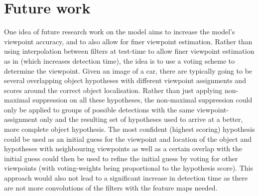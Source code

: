 %

\section{Future work}\label{sec:future}
One idea of future research work on the model  aims to increase the model's viewpoint accuracy, and to also allow for finer viewpoint estimation. Rather than using interpolation between filters at test-time to allow finer viewpoint estimation  as in \cite{Pepik:2012aa} (which increases detection time), the idea is to use a voting scheme to determine the viewpoint. Given an image of a car, there are typically going to be several overlapping object hypotheses with different viewpoint assignments and scores around the correct object localisation. Rather than just applying non-maximal suppression on all these hypotheses, the non-maximal suppression could only be applied to groups of possible detections with the same viewpoint-assignment only and the resulting set of hypotheses used to arrive at a better, more complete object hypothesis. The most confident (highest scoring) hypothesis  could  be used as an initial guess for the viewpoint and location of the object and hypotheses with neighbouring viewpoints as well as a certain overlap with the initial guess could then be used to refine the initial guess by voting for other viewpoints (with voting-weights  being proportional to the hypothesis score). This approach would also not lead to a significant increase in detection time as there are not more convolutions of the filters with the feature maps needed. 

